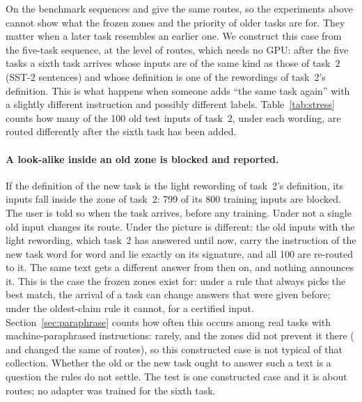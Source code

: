 On the benchmark sequences \nearest{} and \cert{} give the same routes, so the experiments above
cannot show what the frozen zones and the priority of older tasks are for. They matter when a later
task resembles an earlier one. We construct this case from the five-task sequence, at the level of
routes, which needs no GPU: after the five tasks a sixth task arrives whose inputs are of the same
kind as those of task~2 (SST-2 sentences) and whose definition is one of the rewordings of task~2's
definition. This is what happens when someone adds ``the same task again'' with a slightly
different instruction and possibly different labels. Table~\ref{tab:stress} counts how many of the
100 old test inputs of task~2, under each wording, are routed differently after the sixth task has
been added.

\begin{table}[t]
  \caption{Stress test (routes only). A sixth task with SST-2 inputs and a reworded SST-2 definition
  follows the five tasks. ``Blocked'': its training inputs inside an older zone. ``Routes changed'':
  old test inputs of task~2 (100 per wording) routed elsewhere afterwards.}
  \label{tab:stress}
  \centering
  \footnotesize
  \setlength{\tabcolsep}{3pt}
  
\end{table}


\paragraph{A look-alike inside an old zone is blocked and reported.} If the definition of the new
task is the light rewording of task~2's definition, its inputs fall inside the zone of task~2: 799 of
its 800 training inputs are blocked. The user is told so when the task arrives, before any
training. Under \cert{} not a single old input changes its route. Under \nearest{} the picture is
different: the old inputs with the light rewording, which task~2 has answered until now, carry the
instruction of the new task word for word and lie exactly on its signature, and all 100 are
re-routed to it. The same text gets a different answer from then on, and nothing announces it.
This is the case the frozen zones exist for: under a rule that always picks the best match, the
arrival of a task can change answers that were given before; under the oldest-claim rule it
cannot, for a certified input. Section~\ref{sec:paraphrase} counts how often this occurs among \WidenTasksEval{} real tasks with machine-paraphrased instructions: rarely, and the zones did not prevent it there (\nearest{} and \cert{} changed the same \RerouteNearNChanged{} of \RerouteInputs{} routes), so this constructed case is not typical of that collection. Whether the old or the new task ought to answer such a text is a question the rules do not
settle. The test is one constructed case and it is about routes; no adapter was trained for the
sixth task.

